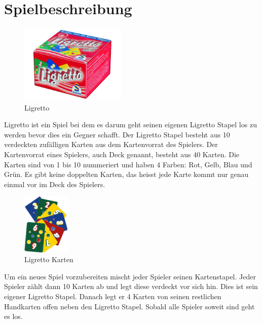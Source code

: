 \section{Spielbeschreibung}

\begin{figure}[hbt]
  \centering
  \includegraphics[width=0.45\textwidth,angle=0]{graphics/ligretto.jpg}
  \caption{Ligretto \hfill{} }
 \end{figure}

Ligretto ist ein Spiel bei dem es darum geht seinen eigenen Ligretto Stapel los zu werden bevor dies ein Gegner schafft. Der Ligretto Stapel besteht aus 10 verdeckten zufälligen Karten aus dem Kartenvorrat des Spielers. Der Kartenvorrat eines Spielers, auch Deck genannt, besteht aus 40 Karten. Die Karten sind von 1 bis 10 nummeriert und haben 4 Farben: Rot, Gelb, Blau und Grün. Es gibt keine doppelten Karten, das heisst jede Karte kommt nur genau einmal vor im Deck des Spielers.

\begin{figure}[hbt]
  \centering
  \includegraphics[width=0.20\textwidth,angle=0]{graphics/ligretto.png}
  \caption{Ligretto Karten \hfill{} }
 \end{figure}

Um ein neues Spiel vorzubereiten mischt jeder Spieler seinen Kartenstapel. Jeder Spieler zählt dann 10 Karten ab und legt diese verdeckt vor sich hin. Dies ist sein eigener Ligretto Stapel. Danach legt er 4 Karten von seinen restlichen Handkarten offen neben den Ligretto Stapel. Sobald alle Spieler soweit sind geht es los.

